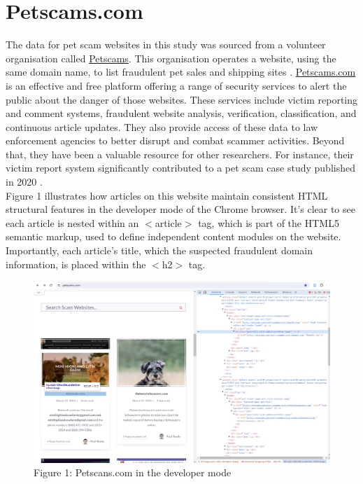 \documentclass[ oneside,%
                    author={Cassie Qing Tang},
                    degree={BSc},
                     title={An Automated Response System for Disrupting Online Pet Scamming \\ },
                    subtitle={ }]{dissertation}
\begin{document}
\section{Petscams.com}
The data for pet scam websites in this study was sourced from a volunteer organisation called \href{https://www.petscams.com}{Petscams}. This organisation operates a website, using the same domain name, to list fraudulent pet sales and shipping sites \cite{brady_fighting_2024}. \href{https://www.petscams.com}{Petscams.com} is an effective and free platform offering a range of security services to alert the public about the danger of those websites. These services include victim reporting and comment systems, fraudulent website analysis, verification, classification, and continuous article updates. They also provide access of these data to law enforcement agencies to better disrupt and combat scammer activities. Beyond that, they have been a valuable resource for other researchers. For instance, their victim report system significantly contributed to a pet scam case study published in 2020 \cite{whittaker_understanding_2020}.
\\

Figure 1 illustrates how articles on this website maintain consistent HTML structural features in the developer mode of the Chrome browser. It's clear to see each article is nested within an $<$article$>$ tag, which is part of the HTML5 semantic markup, used to define independent content modules on the website. Importantly, each article's title, which the suspected fraudulent domain information, is placed within the $<$h2$>$ tag. 
\begin{figure}[H]
\centering
\includegraphics[width=0.8\linewidth,height=0.285\textheight]{pic/figure1.png}
\caption{Figure 1: Petscans.com in the developer mode}
\label{fig:pic1}
\end{figure}
\end{document}
